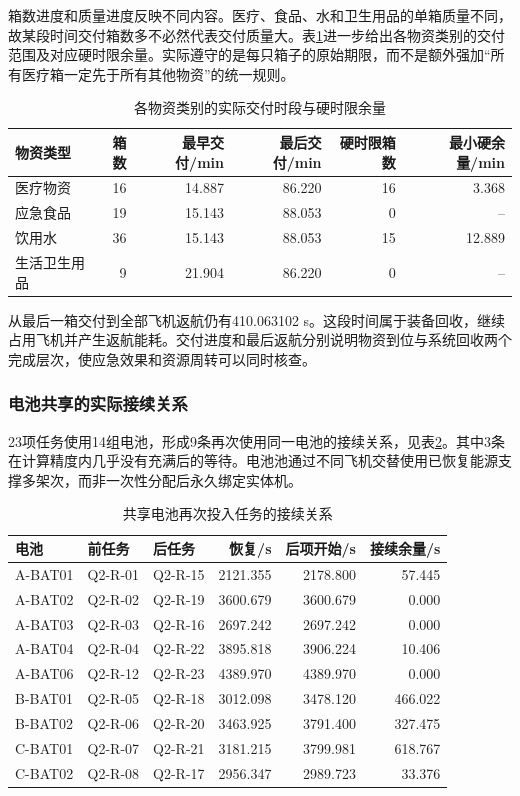 \documentclass[withoutpreface,colorprint]{format}
\numberwithin{equation}{section}
\numberwithin{figure}{section}
\numberwithin{table}{section}
\begin{document}
箱数进度和质量进度反映不同内容。医疗、食品、水和卫生用品的单箱质量不同，故某段时间交付箱数多不必然代表交付质量大。表\ref{tab:rev_delivery_kind}进一步给出各物资类别的交付范围及对应硬时限余量。实际遵守的是每只箱子的原始期限，而不是额外强加“所有医疗箱一定先于所有其他物资”的统一规则。

\begin{table}[htbp]\centering\small
\caption{各物资类别的实际交付时段与硬时限余量}\label{tab:rev_delivery_kind}
\begin{tabular}{lrrrrr}\toprule
物资类型 & 箱数 & 最早交付/min & 最后交付/min & 硬时限箱数 & 最小硬余量/min\\\midrule
医疗物资 & 16 & 14.887 & 86.220 & 16 & 3.368\\
应急食品 & 19 & 15.143 & 88.053 & 0 & --\\
饮用水 & 36 & 15.143 & 88.053 & 15 & 12.889\\
生活卫生用品 & 9 & 21.904 & 86.220 & 0 & --\\
\bottomrule\end{tabular}
\end{table}


从最后一箱交付到全部飞机返航仍有410.063102 s。这段时间属于装备回收，继续占用飞机并产生返航能耗。交付进度和最后返航分别说明物资到位与系统回收两个完成层次，使应急效果和资源周转可以同时核查。

\subsubsection{电池共享的实际接续关系}
23项任务使用14组电池，形成9条再次使用同一电池的接续关系，见表\ref{tab:rev_q2_tight_chains}。其中3条在计算精度内几乎没有充满后的等待。电池池通过不同飞机交替使用已恢复能源支撑多架次，而非一次性分配后永久绑定实体机。

\begin{table}[htbp]\centering\small
\caption{共享电池再次投入任务的接续关系}\label{tab:rev_q2_tight_chains}
\begin{tabular}{lllrrr}\toprule
电池 & 前任务 & 后任务 & 恢复/s & 后项开始/s & 接续余量/s\\\midrule
A-BAT01 & Q2-R-01 & Q2-R-15 & 2121.355 & 2178.800 & 57.445\\
A-BAT02 & Q2-R-02 & Q2-R-19 & 3600.679 & 3600.679 & 0.000\\
A-BAT03 & Q2-R-03 & Q2-R-16 & 2697.242 & 2697.242 & 0.000\\
A-BAT04 & Q2-R-04 & Q2-R-22 & 3895.818 & 3906.224 & 10.406\\
A-BAT06 & Q2-R-12 & Q2-R-23 & 4389.970 & 4389.970 & 0.000\\
B-BAT01 & Q2-R-05 & Q2-R-18 & 3012.098 & 3478.120 & 466.022\\
B-BAT02 & Q2-R-06 & Q2-R-20 & 3463.925 & 3791.400 & 327.475\\
C-BAT01 & Q2-R-07 & Q2-R-21 & 3181.215 & 3799.981 & 618.767\\
C-BAT02 & Q2-R-08 & Q2-R-17 & 2956.347 & 2989.723 & 33.376\\
\bottomrule\end{tabular}
\end{table}
\end{document}
